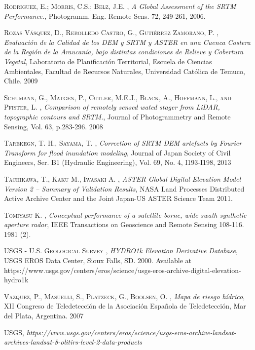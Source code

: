 \begin{thebibliography}{9}
 \textsc{Rodriguez, E.; Morris, C.S.; Belz, J.E.} , \textit{A Global Assessment of the SRTM Performance.},  Photogramm. Eng. Remote Sens. 72, 249-261, 2006.

 \textsc{Rozas Vásquez, D., Rebolledo Castro, G., Gutiérrez Zamorano, P.} , \textit{Evaluación de la Calidad de los DEM y SRTM y ASTER en una Cuenca Costera de la Región de la Araucanía, bajo distintas condiciones de Relieve y Cobertura Vegetal}, Laboratorio de Planificación Territorial, Escuela de Ciencias Ambientales, Facultad de Recursos Naturales, Universidad Católica de Temuco, Chile. 2009

 \textsc{Schumann, G., Matgen, P., Cutler, M.E.J., Black, A., Hoffmann, L., and Pfister, L.} , \textit{Comparison of remotely sensed wated stager from LiDAR, topographic contours and SRTM.}, Journal of Photogrammetry and Remote Sensing, Vol. 63, p.283-296. 2008

 \textsc{Tarekegn, T. H., Sayama, T.} , \textit{Correction of SRTM DEM artefacts by Fourier Transform for flood inundation modeling},  Journal of Japan Society of Civil Engineers, Ser. B1 (Hydraulic Engineering), Vol. 69, No. 4, I193-I198, 2013


 \textsc{Tachikawa, T., Kaku M., Iwasaki A.} , \textit{ASTER Global Digital Elevation Model Version 2 – Summary of Validation Results},  NASA Land Processes Distributed Active Archive Center and the Joint Japan-US ASTER Science Team 2011.

 \textsc{Tomiyasu K.} , \textit{Conceptual performance of a satellite borne, wide swath synthetic aperture radar},  IEEE Transactions on Geoscience and Remote Sensing 108-116. 1981 (2).


 \textsc{USGS - U.S. Geological Survey} , \textit{HYDRO1k Elevation Derivative Database}, USGS EROS Data Center, Sioux Falls, SD. 2000. Available at https://www.usgs.gov/centers/eros/science/usgs-eros-archive-digital-elevation-hydro1k


 \textsc{Vazquez, P., Masuelli, S., Platzeck, G., Boolsen, O.} , \textit{Mapa de riesgo hídrico}, XII Congreso de Teledetección de la Asociación Española de Teledetección, Mar del Plata, Argentina. 2007

 \textsc{USGS}, \textit{https://www.usgs.gov/centers/eros/science/usgs-eros-archive-landsat-archives-landsat-8-olitirs-level-2-data-products}


\end{thebibliography}
